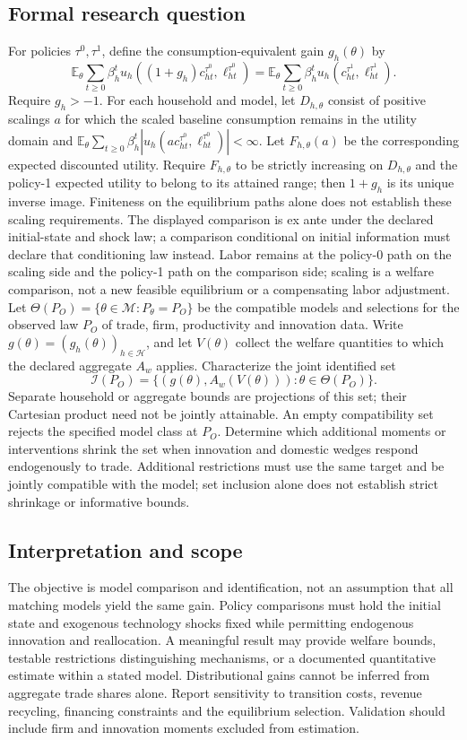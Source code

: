 \documentclass[11pt,a4paper]{article}
\begin{document}
\subsection*{Formal research question}
For policies $\tau^0,\tau^1$, define the consumption-equivalent gain $g_h(\theta)$ by
\[
 \mathbb E_\theta\sum_{t\ge0}\beta_h^tu_h((1+g_h)c_{ht}^{\tau^0},\ell_{ht}^{\tau^0})
 =\mathbb E_\theta\sum_{t\ge0}\beta_h^tu_h(c_{ht}^{\tau^1},\ell_{ht}^{\tau^1}).
\]
Require $g_h>-1$. For each household and model, let $D_{h,\theta}$ consist of positive scalings $a$ for which the scaled baseline consumption remains in the utility domain and $\mathbb E_\theta\sum_{t\ge0}\beta_h^t|u_h(a c_{ht}^{\tau^0},\ell_{ht}^{\tau^0})|<\infty$. Let $F_{h,\theta}(a)$ be the corresponding expected discounted utility. Require $F_{h,\theta}$ to be strictly increasing on $D_{h,\theta}$ and the policy-1 expected utility to belong to its attained range; then $1+g_h$ is its unique inverse image. Finiteness on the equilibrium paths alone does not establish these scaling requirements. The displayed comparison is ex ante under the declared initial-state and shock law; a comparison conditional on initial information must declare that conditioning law instead. Labor remains at the policy-0 path on the scaling side and the policy-1 path on the comparison side; scaling is a welfare comparison, not a new feasible equilibrium or a compensating labor adjustment. Let $\Theta(P_O)=\{\theta\in\mathcal M:P_\theta=P_O\}$ be the compatible models and selections for the observed law $P_O$ of trade, firm, productivity and innovation data. Write $g(\theta)=(g_h(\theta))_{h\in\mathcal H}$, and let $V(\theta)$ collect the welfare quantities to which the declared aggregate $A_w$ applies. Characterize the joint identified set
\[
 \mathcal I(P_O)=\{(g(\theta),A_w(V(\theta))):\theta\in\Theta(P_O)\}.
\]
Separate household or aggregate bounds are projections of this set; their Cartesian product need not be jointly attainable. An empty compatibility set rejects the specified model class at $P_O$. Determine which additional moments or interventions shrink the set when innovation and domestic wedges respond endogenously to trade. Additional restrictions must use the same target and be jointly compatible with the model; set inclusion alone does not establish strict shrinkage or informative bounds.

\subsection*{Interpretation and scope}
The objective is model comparison and identification, not an assumption that all matching models yield the same gain. Policy comparisons must hold the initial state and exogenous technology shocks fixed while permitting endogenous innovation and reallocation. A meaningful result may provide welfare bounds, testable restrictions distinguishing mechanisms, or a documented quantitative estimate within a stated model. Distributional gains cannot be inferred from aggregate trade shares alone. Report sensitivity to transition costs, revenue recycling, financing constraints and the equilibrium selection. Validation should include firm and innovation moments excluded from estimation.
\end{document}
